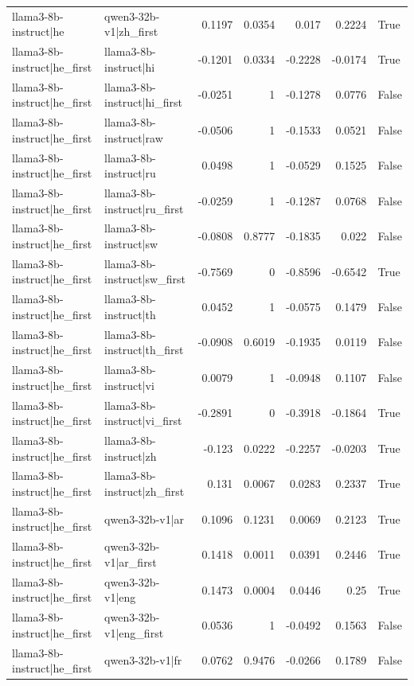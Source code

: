 \begin{table}
\begin{tabular}{l l r r r r l}
llama3-8b-instruct|he & qwen3-32b-v1|zh_first & 0.1197 & 0.0354 & 0.017 & 0.2224 & True \\
llama3-8b-instruct|he_first & llama3-8b-instruct|hi & -0.1201 & 0.0334 & -0.2228 & -0.0174 & True \\
llama3-8b-instruct|he_first & llama3-8b-instruct|hi_first & -0.0251 & 1 & -0.1278 & 0.0776 & False \\
llama3-8b-instruct|he_first & llama3-8b-instruct|raw & -0.0506 & 1 & -0.1533 & 0.0521 & False \\
llama3-8b-instruct|he_first & llama3-8b-instruct|ru & 0.0498 & 1 & -0.0529 & 0.1525 & False \\
llama3-8b-instruct|he_first & llama3-8b-instruct|ru_first & -0.0259 & 1 & -0.1287 & 0.0768 & False \\
llama3-8b-instruct|he_first & llama3-8b-instruct|sw & -0.0808 & 0.8777 & -0.1835 & 0.022 & False \\
llama3-8b-instruct|he_first & llama3-8b-instruct|sw_first & -0.7569 & 0 & -0.8596 & -0.6542 & True \\
llama3-8b-instruct|he_first & llama3-8b-instruct|th & 0.0452 & 1 & -0.0575 & 0.1479 & False \\
llama3-8b-instruct|he_first & llama3-8b-instruct|th_first & -0.0908 & 0.6019 & -0.1935 & 0.0119 & False \\
llama3-8b-instruct|he_first & llama3-8b-instruct|vi & 0.0079 & 1 & -0.0948 & 0.1107 & False \\
llama3-8b-instruct|he_first & llama3-8b-instruct|vi_first & -0.2891 & 0 & -0.3918 & -0.1864 & True \\
llama3-8b-instruct|he_first & llama3-8b-instruct|zh & -0.123 & 0.0222 & -0.2257 & -0.0203 & True \\
llama3-8b-instruct|he_first & llama3-8b-instruct|zh_first & 0.131 & 0.0067 & 0.0283 & 0.2337 & True \\
llama3-8b-instruct|he_first & qwen3-32b-v1|ar & 0.1096 & 0.1231 & 0.0069 & 0.2123 & True \\
llama3-8b-instruct|he_first & qwen3-32b-v1|ar_first & 0.1418 & 0.0011 & 0.0391 & 0.2446 & True \\
llama3-8b-instruct|he_first & qwen3-32b-v1|eng & 0.1473 & 0.0004 & 0.0446 & 0.25 & True \\
llama3-8b-instruct|he_first & qwen3-32b-v1|eng_first & 0.0536 & 1 & -0.0492 & 0.1563 & False \\
llama3-8b-instruct|he_first & qwen3-32b-v1|fr & 0.0762 & 0.9476 & -0.0266 & 0.1789 & False \\

\end{tabular}
\end{table}
